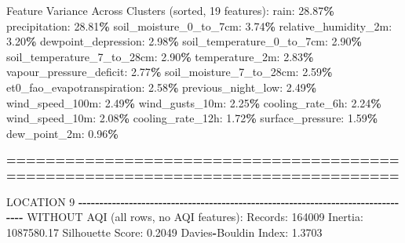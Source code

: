 \documentclass[
  letterpaper,
  DIV=11,
  numbers=noendperiod]{scrartcl}
\newenvironment{Shaded}{\begin{snugshade}}{\end{snugshade}}
\newcommand{\BuiltInTok}[1]{#1}
\newcommand{\DecValTok}[1]{\textcolor[rgb]{0.00,0.00,0.81}{#1}}
\newcommand{\FloatTok}[1]{\textcolor[rgb]{0.00,0.00,0.81}{#1}}
\newcommand{\NormalTok}[1]{#1}
\newcommand{\OperatorTok}[1]{\textcolor[rgb]{0.81,0.36,0.00}{\textbf{#1}}}
\begin{document}
\begin{Shaded}
\begin{Highlighting}[]
\NormalTok{  Feature Variance Across Clusters (}\BuiltInTok{sorted}\NormalTok{, }\DecValTok{19}\NormalTok{ features):}
\NormalTok{    rain: }\FloatTok{28.87}\OperatorTok{\%}
\NormalTok{    precipitation: }\FloatTok{28.81}\OperatorTok{\%}
\NormalTok{    soil\_moisture\_0\_to\_7cm: }\FloatTok{3.74}\OperatorTok{\%}
\NormalTok{    relative\_humidity\_2m: }\FloatTok{3.20}\OperatorTok{\%}
\NormalTok{    dewpoint\_depression: }\FloatTok{2.98}\OperatorTok{\%}
\NormalTok{    soil\_temperature\_0\_to\_7cm: }\FloatTok{2.90}\OperatorTok{\%}
\NormalTok{    soil\_temperature\_7\_to\_28cm: }\FloatTok{2.90}\OperatorTok{\%}
\NormalTok{    temperature\_2m: }\FloatTok{2.83}\OperatorTok{\%}
\NormalTok{    vapour\_pressure\_deficit: }\FloatTok{2.77}\OperatorTok{\%}
\NormalTok{    soil\_moisture\_7\_to\_28cm: }\FloatTok{2.59}\OperatorTok{\%}
\NormalTok{    et0\_fao\_evapotranspiration: }\FloatTok{2.58}\OperatorTok{\%}
\NormalTok{    previous\_night\_low: }\FloatTok{2.49}\OperatorTok{\%}
\NormalTok{    wind\_speed\_100m: }\FloatTok{2.49}\OperatorTok{\%}
\NormalTok{    wind\_gusts\_10m: }\FloatTok{2.25}\OperatorTok{\%}
\NormalTok{    cooling\_rate\_6h: }\FloatTok{2.24}\OperatorTok{\%}
\NormalTok{    wind\_speed\_10m: }\FloatTok{2.08}\OperatorTok{\%}
\NormalTok{    cooling\_rate\_12h: }\FloatTok{1.72}\OperatorTok{\%}
\NormalTok{    surface\_pressure: }\FloatTok{1.59}\OperatorTok{\%}
\NormalTok{    dew\_point\_2m: }\FloatTok{0.96}\OperatorTok{\%}

\OperatorTok{================================================================================}

\NormalTok{LOCATION }\DecValTok{9}
\OperatorTok{{-}{-}{-}{-}{-}{-}{-}{-}{-}{-}{-}{-}{-}{-}{-}{-}{-}{-}{-}{-}{-}{-}{-}{-}{-}{-}{-}{-}{-}{-}{-}{-}{-}{-}{-}{-}{-}{-}{-}{-}{-}{-}{-}{-}{-}{-}{-}{-}{-}{-}{-}{-}{-}{-}{-}{-}{-}{-}{-}{-}{-}{-}{-}{-}{-}{-}{-}{-}{-}{-}{-}{-}{-}{-}{-}{-}{-}{-}{-}{-}}
\NormalTok{WITHOUT AQI (}\BuiltInTok{all}\NormalTok{ rows, no AQI features):}
\NormalTok{  Records: }\DecValTok{164009}
\NormalTok{  Inertia: }\FloatTok{1087580.17}
\NormalTok{  Silhouette Score: }\FloatTok{0.2049}
\NormalTok{  Davies}\OperatorTok{{-}}\NormalTok{Bouldin Index: }\FloatTok{1.3703}


\end{Highlighting}
\end{Shaded}
\end{document}
